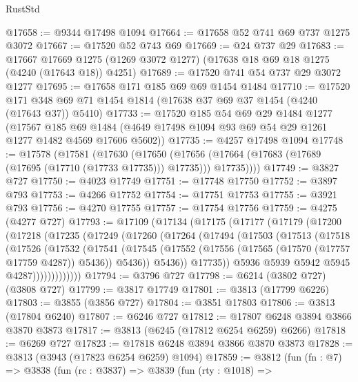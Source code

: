 \begin{lexlean}{RustStd}
\begin{coremodule}
@17658 := @9344 @17498 @1094
@17664 := @17658 @52 @741 @69 @737 @1275 @3072
@17667 := @17520 @52 @743 @69
@17669 := @24 @737 @29
@17683 := @17667
    @17669
    @1275
    (@1269 @3072 @1277)
    (@17638 @18 @69 @18 @1275 (@4240 (@17643 @18)) @4251)
@17689 := @17520 @741 @54 @737 @29 @3072 @1277
@17695 := @17658 @171 @185 @69 @69 @1454 @1484
@17710 := @17520 @171 @348 @69 @71 @1454 @1814 (@17638 @37 @69 @37 @1454 (@4240 (@17643 @37)) @5410)
@17733 := @17520
    @185
    @54
    @69
    @29
    @1484
    @1277
    (@17567
      @185
      @69
      @1484
      (@4649 @17498 @1094 @93 @69 @54 @29 @1261 @1277 @1482 @4569 @17606 @5602))
@17735 := @4257 @17498 @1094
@17748 := @17578
    (@17581
      (@17630
        (@17650
          (@17656 (@17664 (@17683 (@17689 (@17695 (@17710 (@17733 @17735))) @17735))) @17735))))
@17749 := @3827 @727
@17750 := @4023 @17749
@17751 := @17748 @17750
@17752 := @3897 @793
@17753 := @4266 @17752
@17754 := @17751 @17753
@17755 := @3921 @793
@17756 := @4270 @17755
@17757 := @17754 @17756
@17759 := @4275 (@4277 @727)
@17793 := @17109
    (@17134
      (@17175
        (@17177
          (@17179
            (@17200
              (@17218
                (@17235
                  (@17249
                    (@17260
                      (@17264
                        (@17494
                          (@17503
                            (@17513
                              (@17518
                                (@17526
                                  (@17532
                                    (@17541
                                      (@17545
                                        (@17552
                                          (@17556 (@17565 (@17570 (@17757 @17759 @4287)) @5436))
                                          @5436))
                                      @5436))
                                  @17735))
                              @5936
                              @5939
                              @5942
                              @5945
                              @4287)))))))))))))
@17794 := @3796 @727
@17798 := @6214 (@3802 @727) (@3808 @727)
@17799 := @3817 @17749
@17801 := @3813 (@17799 @6226)
@17803 := @3855 (@3856 @727)
@17804 := @3851 @17803
@17806 := @3813 (@17804 @6240)
@17807 := @6246 @727
@17812 := @17807 @6248 @3894 @3866 @3870 @3873
@17817 := @3813 (@6245 (@17812 @6254 @6259) @6266)
@17818 := @6269 @727
@17823 := @17818 @6248 @3894 @3866 @3870 @3873
@17828 := @3813 (@3943 (@17823 @6254 @6259) @1094)
@17859 := @3812
    (fun (fn : @7) =>
    @3838
      (fun (rc : @3837) =>
      @3839
        (fun (rty : @1018) =>

\end{coremodule}
\end{lexlean}
